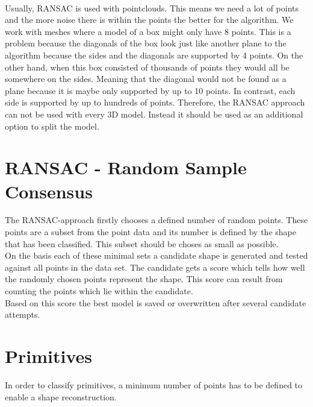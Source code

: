 \documentclass[../ClassicThesis.tex]{subfiles}
\begin{document}
\*\\
Usually, RANSAC is used with pointclouds. This means we need a lot of points and the more noise there is within the points the better for the algorithm. We work with meshes where a model of a box might only have 8 points. This is a problem because the diagonals of the box look just like another plane to the algorithm because the sides and the diagonals are supported by 4 points. 
On the other hand, when this box consisted of thousands of points they would all be somewhere on the sides. Meaning that the diagonal would not be found as a plane because it is maybe only supported by up to 10 points. In contrast, each side is supported by up to hundreds of points. Therefore, the RANSAC approach can not be used with every 3D model. Instead it should be used as an additional option to split the model.
\section{RANSAC - Random Sample Consensus}
The RANSAC-approach firstly chooses a defined number of random points. These points are a subset from the point data and its number is defined by the shape that has been classified. This subset should be choses as small as possible.\\
On the basis each of these minimal sets a candidate shape is generated and tested against all points in the data set. The candidate gets a score which tells how well the randomly chosen points represent the shape. This score can result from counting the points which lie within the candidate.\\
Based on this score the best model is saved or overwritten after several candidate attempts.
\section{Primitives}
In order to classify primitives, a minimum number of points has to be defined to enable a shape reconstruction.
\end{document}
